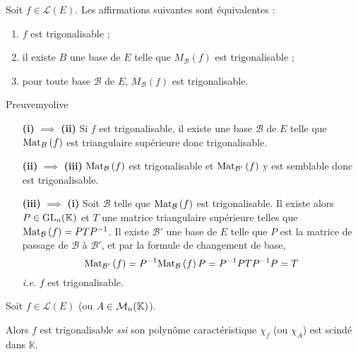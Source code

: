     \begin{prop}{}{}
        Soit $f \in \mathcal{L}(E)$. Les affirmations suivantes sont équivalentes :
        \begin{enumerate}
            \item $f$ est trigonalisable ;
            \item il existe $B$ une base de $E$ telle que $M_{\mathcal{B}}(f)$ est trigonalisable ;
            \item pour toute base $\mathcal{B}$ de $E$, $M_{\mathcal{B}}(f)$ est trigonalisable.
        \end{enumerate}
    \end{prop}

    \begin{demo}{Preuve}{myolive}
        \begin{itemize}[leftmargin=2cm]
            \item[\textbf{(i)} $\implies$ \textbf{(ii)}] Si $f$ est trigonalisable, il existe une base $\mathcal{B}$ de $E$ telle que $\text{Mat}_{B}\left(f\right)$ est triangulaire supérieure donc trigonalisable.
            \item[\textbf{(ii)} $\implies$ \textbf{(iii)}] $\text{Mat}_{\mathcal{B}}\left(f\right)$ est trigonalisable et $\text{Mat}_{\mathcal{B}'}\left(f\right)$ y est semblable donc est trigonalisable.
            \item[\textbf{(iii)} $\implies$ \textbf{(i)}] Soit $\mathcal{B}$ telle que $\text{Mat}_{\mathcal{B}}\left(f\right)$ est trigonalisable. Il existe alors $P \in \operatorname{GL}_n(\mathbb{K})$ et $T$ une matrice triangulaire supérieure telles que $\text{Mat}_{\mathcal{B}}\left(f\right) = P T P^{-1}$. Il existe $\mathcal{B}'$ une base de $E$ telle que $P$ est la matrice de passage de $\mathcal{B}$ à $\mathcal{B}'$, et par la formule de changement de base,
            \[ \text{Mat}_{\mathcal{B}'}\left(f\right) = P^{-1} \text{Mat}_{\mathcal{B}}\left(f\right)  P = P^{-1} P T P^{-1} P = T \]   
            \textit{i.e.} $f$ est trigonalisable.
        \end{itemize}
    \end{demo}

    \begin{theo}{}{}
        Soit $f \in \mathcal{L}(E)$ (ou $A \in \mathcal{M}_{n}(\mathbb{K})$). 

        Alors $f$ est trigonalisable \textit{ssi} son polynôme caractéristique $\chi_f$ (ou $\chi_A$) est scindé dans $\mathbb{K}$.
    \end{theo}

